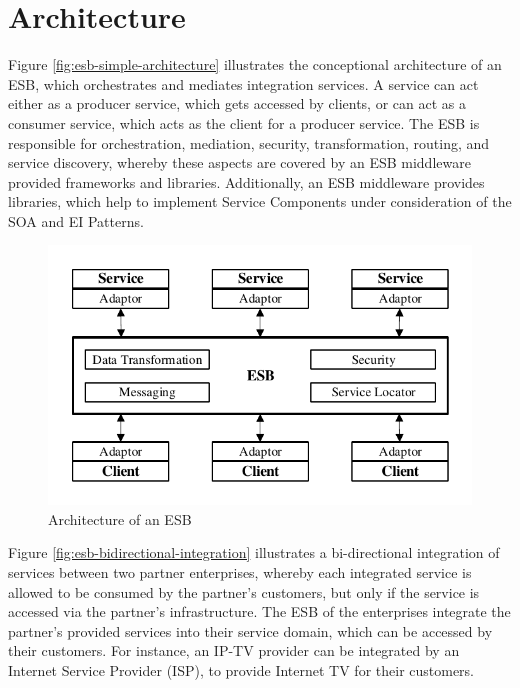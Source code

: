 \section{Architecture}
\label{sec:esb-architecture}
Figure \vref{fig:esb-simple-architecture} illustrates the conceptional architecture of an ESB, which orchestrates and mediates integration services. A service can act either as a producer service, which gets accessed by clients, or can act as a consumer service, which acts as the client for a producer service. The ESB is responsible for orchestration, mediation, security, transformation, routing, and service discovery, whereby these aspects are covered by an ESB middleware provided frameworks and libraries. Additionally, an ESB middleware provides libraries, which help to implement Service Components under consideration of the SOA and EI Patterns\cite{EsbSoa2018, MediationESB2005}.

\begin{figure}[htbp]
	\centering
	\includegraphics[scale=1]{images/esb-simple-architecture.pdf}
	\caption{Architecture of an ESB}
	\label{fig:esb-simple-architecture}
\end{figure} 

Figure \vref{fig:esb-bidirectional-integration} illustrates a bi-directional integration of services between two partner enterprises, whereby each integrated service is allowed to be consumed by the partner's customers, but only if the service is accessed via the partner's infrastructure. The ESB of the enterprises integrate the partner's provided services into their service domain, which can be accessed by their customers. For instance, an IP-TV provider can be integrated by an Internet Service Provider (ISP), to provide Internet TV for their customers.
\newpage 

